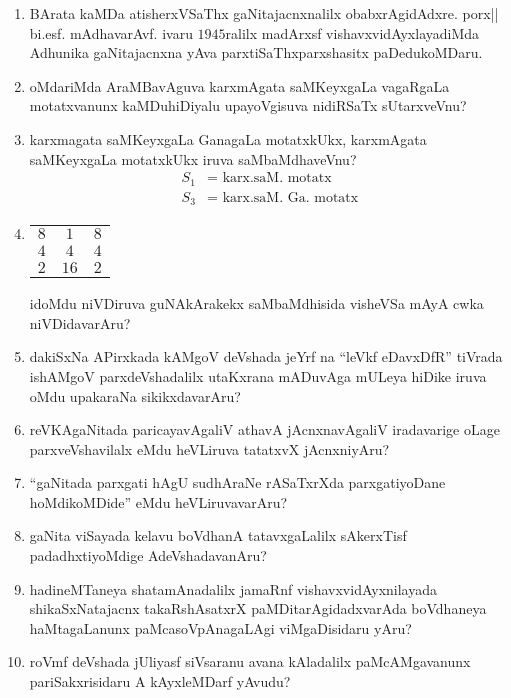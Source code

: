 \begin{enumerate}
\item BArata kaMDa atisherxVSaThx gaNitajacnxnalilx obabxrAgidAdxre. porx|| bi.esf. mAdhavarAvf. ivaru $1945$ralilx madArxsf vishavxvidAyxlayadiMda Adhunika gaNitajacnxna yAva parxtiSaThxparxshasitx paDedukoMDaru.
  
\item oMdariMda AraMBavAguva karxmAgata saMKeyxgaLa vagaRgaLa motatxvanunx kaMDuhiDiyalu upayoVgisuva nidiRSaTx sUtarxveVnu?

  \newpage
  
\item karxmagata saMKeyxgaLa GanagaLa motatxkUkx, karxmAgata saMKeyxgaLa motatxkUkx iruva saMbaMdhaveVnu?
  \begin{align*}
    S_1 & = \text{ karx.saM. motatx}\\
    S_3 & = \text{ karx.saM. Ga. motatx}
  \end{align*}
  
\item
    \begin{tabular}[t]{ccc}
    $8$&$1$&$8$\\
    $4$&$4$&$4$\\
    $2$&$16$&$2$
  \end{tabular}

  idoMdu niVDiruva guNAkArakekx saMbaMdhisida visheVSa mAyA cwka niVDidavarAru?
  
\item dakiSxNa APirxkada kAMgoV deVshada jeYrf na ``leVkf eDavxDfR'' tiVrada ishAMgoV parxdeVshadalilx utaKxrana mADuvAga mULeya hiDike iruva oMdu upakaraNa sikikxdavarAru?

\item reVKAgaNitada paricayavAgaliV athavA jAcnxnavAgaliV iradavarige oLage parxveVshavilalx eMdu heVLiruva tatatxvX jAcnxniyAru?

\item ``gaNitada parxgati hAgU sudhAraNe rASaTxrXda parxgatiyoDane hoMdikoMDide'' eMdu heVLiruvavarAru?

\item gaNita viSayada kelavu boVdhanA tatavxgaLalilx sAkerxTisf padadhxtiyoMdige AdeVshadavanAru?

\item hadineMTaneya shatamAnadalilx jamaRnf vishavxvidAyxnilayada shikaSxNatajacnx takaRshAsatxrX paMDitarAgidadxvarAda boVdhaneya haMtagaLanunx paMcasoVpAnagaLAgi viMgaDisidaru yAru?

\item roVmf deVshada jUliyasf siVsaranu avana kAladalilx paMcAMgavanunx pariSakxrisidaru A kAyxleMDarf yAvudu?


\end{enumerate}
